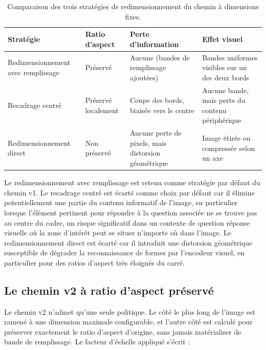 \documentclass[12pt,a4paper]{report}
\begin{document}
\begin{table}[htbp]
  \centering
  \renewcommand{\arraystretch}{1.5}
  \begin{tabular}{|p{4cm}|p{2.8cm}|p{4.2cm}|p{4.2cm}|}
    \hline
    \textbf{Stratégie} & \textbf{Ratio d'aspect} & \textbf{Perte d'information} & \textbf{Effet visuel} \\
    \hline
    Redimensionnement avec remplissage & Préservé & Aucune (bandes de remplissage ajoutées) & Bandes uniformes visibles sur un des deux bords \\
    \hline
    Recadrage centré & Préservé localement & Coupe des bords, biaisée vers le centre & Aucune bande, mais perte du contenu périphérique \\
    \hline
    Redimensionnement direct & Non préservé & Aucune perte de pixels, mais distorsion géométrique & Image étirée ou compressée selon un axe \\
    \hline
  \end{tabular}
  \vspace{0.2cm}
  \caption{Comparaison des trois stratégies de redimensionnement du chemin à dimensions fixes.}
  \label{tab:resize_strategies}
\end{table}

Le redimensionnement avec remplissage est retenu comme stratégie par défaut du chemin v1. Le recadrage centré est écarté comme choix par défaut car il élimine potentiellement une partie du contenu informatif de l'image, en particulier lorsque l'élément pertinent pour répondre à la question associée ne se trouve pas au centre du cadre, un risque significatif dans un contexte de question réponse visuelle où la zone d'intérêt peut se situer n'importe où dans l'image. Le redimensionnement direct est écarté car il introduit une distorsion géométrique susceptible de dégrader la reconnaissance de formes par l'encodeur visuel, en particulier pour des ratios d'aspect très éloignés du carré.

\subsection{Le chemin v2 à ratio d'aspect préservé}

Le chemin v2 n'admet qu'une seule politique. Le côté le plus long de l'image est ramené à une dimension maximale configurable, et l'autre côté est calculé pour préserver exactement le ratio d'aspect d'origine, sans jamais matérialiser de bande de remplissage. Le facteur d'échelle appliqué s'écrit :
\end{document}
